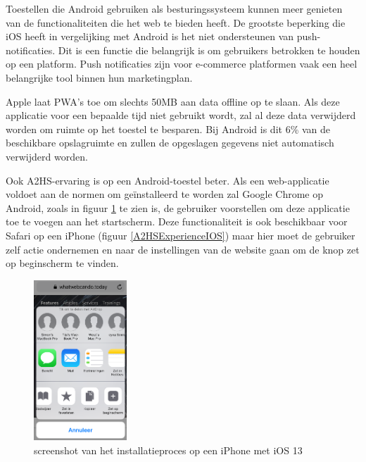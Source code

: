 		Toestellen die Android gebruiken als besturingssysteem kunnen meer genieten van de functionaliteiten die het web te bieden heeft.
		De grootste beperking die iOS heeft in vergelijking met Android is het niet ondersteunen van push-notificaties. Dit is een functie die belangrijk is om gebruikers betrokken te houden op een platform. Push notificaties zijn voor e-commerce platformen vaak een heel belangrijke tool binnen hun marketingplan.
		\autocite{Anastasia2017}
		
		Apple laat PWA's toe om slechts 50MB aan data offline op te slaan. Als deze applicatie voor een bepaalde tijd niet gebruikt wordt, zal al deze data verwijderd worden om ruimte op het toestel te besparen. Bij Android is dit 6\% van de beschikbare opslagruimte en zullen de opgeslagen gegevens niet automatisch verwijderd worden.
		
		Ook A2HS-ervaring is op een Android-toestel beter. Als een web-applicatie voldoet aan de normen om geïnstalleerd te worden zal Google Chrome op Android, zoals in figuur \ref{A2HSExperienceAndroid} te zien is, de gebruiker voorstellen om deze applicatie toe te voegen aan het startscherm. Deze functionaliteit is ook beschikbaar voor Safari op een iPhone (figuur \ref{A2HSExperienceIOS}) maar hier moet de gebruiker zelf actie ondernemen en naar de instellingen van de website gaan om de knop zet op beginscherm te vinden.
		
		\begin{figure}[H]
			\centering
			\includegraphics[width=35mm]{./img/installation_iOS.png}
			\caption{screenshot van het installatieproces op een iPhone met iOS 13}
			\label{A2HSExperienceAndroid}
		\end{figure}
		
